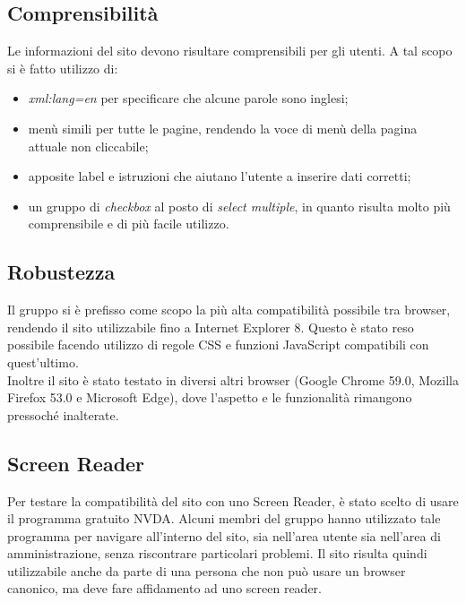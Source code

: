 \subsection{Comprensibilità}
Le informazioni del sito devono risultare comprensibili per gli utenti. A tal scopo si è fatto utilizzo di:
	\begin{itemize}
		\item \textit{xml:lang=en} per specificare che alcune parole sono inglesi;
		\item menù simili per tutte le pagine, rendendo la voce di menù della pagina attuale non cliccabile;
		\item apposite label e istruzioni che aiutano l'utente a inserire dati corretti;
		\item un gruppo di \textit{checkbox} al posto di \textit{select multiple}, in quanto risulta molto più comprensibile e di più facile utilizzo.
	\end{itemize}
\subsection{Robustezza}
Il gruppo si è prefisso come scopo la più alta compatibilità possibile tra browser, rendendo il sito utilizzabile fino a Internet Explorer 8. Questo è stato reso possibile facendo utilizzo di regole CSS e funzioni JavaScript compatibili
con quest'ultimo. \\
Inoltre il sito è stato testato in diversi altri browser (Google Chrome 59.0, Mozilla Firefox 53.0 e Microsoft Edge), dove l'aspetto e le funzionalità rimangono pressoché inalterate.

\subsection{Screen Reader}
Per testare la compatibilità del sito con uno Screen Reader, è stato scelto di usare il programma gratuito NVDA. Alcuni membri del gruppo hanno utilizzato tale programma per navigare all’interno del sito, sia nell’area utente sia nell’area di amministrazione, senza riscontrare particolari problemi. Il sito risulta quindi utilizzabile anche da parte di una persona che non può usare un browser canonico, ma deve fare affidamento ad uno screen reader.